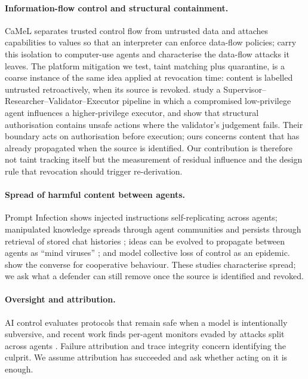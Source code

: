\documentclass[10pt,a4paper]{article}
\begin{document}
\paragraph{Information-flow control and structural containment.} CaMeL \citep{debenedetti2025camel} separates trusted control flow from untrusted data and attaches capabilities to values so that an interpreter can enforce data-flow policies; \citet{foerster2026camels} carry this isolation to computer-use agents and characterise the data-flow attacks it leaves. The platform mitigation we test, taint matching plus quarantine, is a coarse instance of the same idea applied at revocation time: content is labelled untrusted retroactively, when its source is revoked. \citet{safin2026trust} study a Supervisor--Researcher--Validator--Executor pipeline in which a compromised low-privilege agent influences a higher-privilege executor, and show that structural authorisation contains unsafe actions where the validator's judgement fails. Their boundary acts on authorisation before execution; ours concerns content that has already propagated when the source is identified. Our contribution is therefore not taint tracking itself but the measurement of residual influence and the design rule that revocation should trigger re-derivation.

\paragraph{Spread of harmful content between agents.} Prompt Infection \citep{lee2024prompt} shows injected instructions self-replicating across agents; manipulated knowledge spreads through agent communities and persists through retrieval of stored chat histories \citep{ju2024flooding}; ideas can be evolved to propagate between agents as ``mind viruses'' \citep{papadopoulos2026mind}; and \citet{wu2026collective} model collective loss of control as an epidemic. \citet{hsing2026yoao} show the converse for cooperative behaviour. These studies characterise spread; we ask what a defender can still remove once the source is identified and revoked.

\paragraph{Oversight and attribution.} AI control \citep{greenblatt2024control} evaluates protocols that remain safe when a model is intentionally subversive, and recent work finds per-agent monitors evaded by attacks split across agents \citep{makins2026multiagent,kitaoka2026redteaming}. Failure attribution \citep{zhang2025which} and trace integrity \citep{qin2026tamper} concern identifying the culprit. We assume attribution has succeeded and ask whether acting on it is enough.
\end{document}
